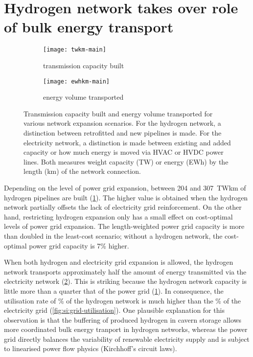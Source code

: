 \section*{Hydrogen network takes over role of bulk energy transport}
\label{sec:energy-moved}

\begin{figure}
    \centering
        \begin{subfigure}[t]{0.49\textwidth}
            \centering
            \caption{transmission capacity built}
            \texttt{[image: twkm-main]}
            \label{fig:network-stats:twkm}
        \end{subfigure}
        \begin{subfigure}[t]{0.49\textwidth}
            \centering
            \caption{energy volume transported}
            \texttt{[image: ewhkm-main]}
            \label{fig:network-stats:ewhkm}
        \end{subfigure}
    \caption{Transmission capacity built and energy volume transported for
        various network expansion scenarios. For the hydrogen network, a
        distinction between retrofitted and new pipelines is made. For the
        electricity network, a distinction is made between existing and added
        capacity or how much energy is moved via HVAC or HVDC power lines. Both
        measures weight capacity (TW) or energy (EWh) by the length (km) of the
        network connection.}
    \label{fig:network-stats}
\end{figure}

Depending on the level of power grid expansion, between 204 and 307~TWkm of
hydrogen pipelines are built (\cref{fig:network-stats:twkm}). The higher value
is obtained when the hydrogen network partially offsets the lack of electricity
grid reinforcement. On the other hand, restricting hydrogen expansion only has a
small effect on cost-optimal levels of power grid expansion. The length-weighted
power grid capacity is more than doubled in the least-cost scenario; without a
hydrogen network, the cost-optimal power grid capacity is 7\% higher.

When both hydrogen and electricity grid expansion is allowed, the hydrogen
network transports approximately half the amount of energy transmitted via the
electricity network (\cref{fig:network-stats:ewhkm}). This is striking because
the hydrogen network capacity is little more than a quarter that of the power
grid (\cref{fig:network-stats:twkm}). In consequence, the utilisation rate of
\utilisationHy\% of the hydrogen network is much higher than the
\utilisationAC\% of the electricity grid (\cref{fig:si:grid-utilisation}). One
plausible explanation for this observation is that the buffering of produced
hydrogen in cavern storage allows more coordinated bulk energy tranport in
hydrogen networks, whereas the power grid directly balances the variability of
renewable electricity supply and is subject to linearised power flow physics
(Kirchhoff's circuit laws).

